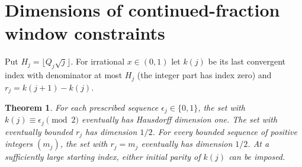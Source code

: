 \documentclass[11pt]{article}
\newtheorem{theorem}{Theorem}
\theoremstyle{definition}
\theoremstyle{remark}
\begin{document}
\section{Dimensions of continued-fraction window constraints}
Put $H_j=\lfloor Q_j\sqrt j\rfloor$. For irrational $x\in(0,1)$ let
$k(j)$ be its last convergent index with denominator at most $H_j$
(the integer part has index zero) and $r_j=k(j+1)-k(j)$.
\begin{theorem}\label{thm:windows}
For each prescribed sequence $\epsilon_j\in\{0,1\}$, the set with
$k(j)\equiv\epsilon_j\pmod2$ eventually has Hausdorff dimension one.
The set with eventually bounded $r_j$ has dimension $1/2$.
For every bounded sequence of positive integers $(m_j)$, the set
with $r_j=m_j$ eventually has dimension $1/2$. At a sufficiently
large starting index, either initial parity of $k(j)$ can be imposed.
\end{theorem}
\end{document}
